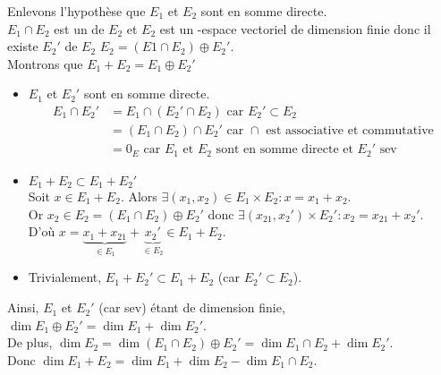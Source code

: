 \documentclass{article}
\renewenvironment{question_kholle}[2][ ]
{
	\subsection{\texorpdfstring{#2}{}}
	\notblank{#1}
	{
		\noindent #1
		\bigbreak
	}
	{}
	\begin{proof}
}
{
	\end{proof}
}
\begin{document}
\begin{question_kholle}
		Enlevons l'hypothèse que $E_1$ et $E_2$ sont en somme directe. \\
		$E_1 \cap E_2$ est un \sev de $E_2$ et $E_2$ est un \K-espace vectoriel de dimension finie donc il existe $E_2'$ \sev de $E_2$ \tq $E_2 = (E1 \cap E_2) \oplus E_2'$. \\
		Montrons que $E_1 + E_2 = E_1 \oplus E_2'$
		\begin{itemize}[label=$*$]
			\item $E_1$ et $E_2'$ sont en somme directe. \\
			\begin{equation*}
				\begin{aligned}
					E_1 \cap E_2' &= E_1 \cap \left( E_2' \cap E_2 \right) \text{ car } E_2' \subset E_2 \\
					&= \left( E_1 \cap E_2 \right) \cap E_2' \text{ car } \cap \text{ est associative et commutative} \\
					&= {0_E} \text{ car $E_1$ et $E_2$ sont en somme directe et $E_2'$ sev}
				\end{aligned}
			\end{equation*}
			\item $E_1 + E_2 \subset E_1 + E_2'$ \\
			Soit $x \in E_1 + E_2$.
			Alors $\exists (x_1, x_2) \in E_1 \times E_2 : x = x_1 + x_2$. \\
			Or $x_2 \in E_2 = \left( E_1 \cap E_2 \right) \oplus E_2'$ donc $\exists (x_{21}, x_2') \times E_2' : x_2 = x_{21} + x_2'$. \\
			D'où $x = \underbrace{x_1 + x_{21}}_{\in E_1} + \underbrace{x_2'}_{\in E_2} \in E_1 + E_2$.
			\item Trivialement, $E_1 + E_2' \subset E_1 + E_2$ (car $E_2' \subset E_2$). 
		\end{itemize}
		
		Ainsi, $E_1$ et $E_2'$ (car sev) étant de dimension finie, $\dim E_1 \oplus E_2' = \dim E_1 + \dim E_2'$. \\
		De plus, $\dim E_2 = \dim (E_1 \cap E_2) \oplus E_2' = \dim E_1 \cap E_2 + \dim E_2'$. \\
		Donc $\dim E_1 + E_2 = \dim E_1 + \dim E_2 - \dim E_1 \cap E_2$.
	\end{question_kholle}
\end{document}
